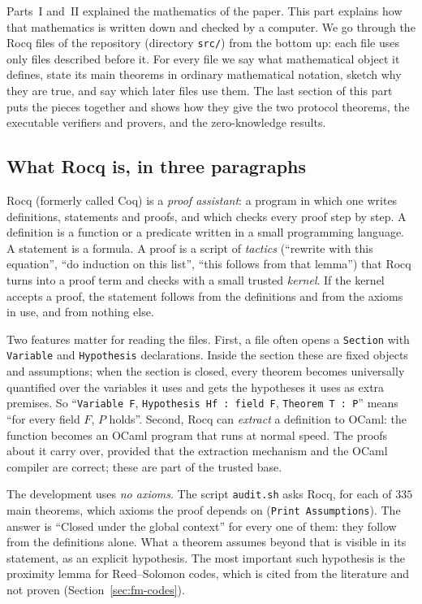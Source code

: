 \documentclass[11pt,a4paper]{article}
\theoremstyle{definition}
\theoremstyle{plain}
\begin{document}
Parts~I and~II explained the mathematics of the paper. This part explains how that mathematics is
written down and checked by a computer. We go through the Rocq files of the repository
(directory \texttt{src/}) from the bottom up: each file uses only files described before it. For
every file we say what mathematical object it defines, state its main theorems in ordinary
mathematical notation, sketch why they are true, and say which later files use them. The last
section of this part puts the pieces together and shows how they give the two protocol theorems,
the executable verifiers and provers, and the zero-knowledge results.

\subsection{What Rocq is, in three paragraphs}

Rocq (formerly called Coq) is a \emph{proof assistant}: a program in which one writes
definitions, statements and proofs, and which checks every proof step by step. A definition is a
function or a predicate written in a small programming language. A statement is a formula. A proof
is a script of \emph{tactics} (``rewrite with this equation'', ``do induction on this list'',
``this follows from that lemma'') that Rocq turns into a proof term and checks with a small trusted
\emph{kernel}. If the kernel accepts a proof, the statement follows from the definitions and from
the axioms in use, and from nothing else.

Two features matter for reading the files. First, a file often opens a \texttt{Section} with
\texttt{Variable} and \texttt{Hypothesis} declarations. Inside the section these are fixed objects
and assumptions; when the section is closed, every theorem becomes universally quantified over the
variables it uses and gets the hypotheses it uses as extra premises. So ``\texttt{Variable F},
\texttt{Hypothesis Hf : field F}, \texttt{Theorem T : P}'' means ``for every field $F$, $P$
holds''. Second, Rocq can \emph{extract} a definition to OCaml: the function becomes an OCaml
program that runs at normal speed. The proofs about it carry over, provided that the extraction
mechanism and the OCaml compiler are correct; these are part of the trusted base.

The development uses \emph{no axioms}. The script \texttt{audit.sh} asks Rocq, for each of $335$
main theorems, which axioms the proof depends on (\texttt{Print Assumptions}). The answer is
``Closed under the global context'' for every one of them: they follow from the definitions alone.
What a theorem assumes beyond that is visible in its statement, as an explicit hypothesis. The most
important such hypothesis is the proximity lemma for Reed--Solomon codes, which is cited from the
literature and not proven (Section~\ref{sec:fm-codes}).
\end{document}
